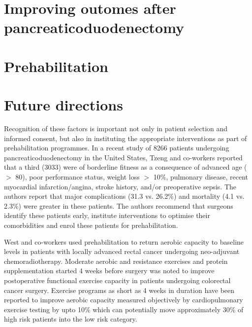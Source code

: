 

\section{Improving outomes after pancreaticoduodenectomy}


\section{Prehabilitation}


\section{Future directions}
Recognition of these factors is important not only in patient selection and informed consent, but also in instituting the appropriate interventions as part of prehabilitation programmes. 
In a recent study of 8266 patients undergoing pancreaticoduodenectomy in the United States, Tzeng and co-workers reported that a third (3033) were of borderline fitness as a consequence of advanced age ($>$ 80), poor performance status, weight loss $>$ 10\%, pulmonary disease, recent myocardial infarction/angina, stroke history, and/or preoperative sepsis. 
The authors report that major complications (31.3 vs. 26.2\%) and mortality (4.1 vs. 2.3\%) were greater in these patients.\parencite{tzeng_morbidity_2014} 
The authors recommend that surgeons identify these patients early, institute interventions to optimise their comorbidities and enrol these patients for prehabilitation. 

West and co-workers used prehabilitation to return aerobic capacity to baseline levels in patients with locally advanced rectal cancer undergoing neo-adjuvant chemoradiotherapy.\parencite{west_effect_2015} 
Moderate aerobic and resistance exercises and protein supplementation started 4 weeks before surgery was noted to improve postoperative functional exercise capacity in patients undergoing colorectal cancer surgery.\parencite{gillis_prehabilitation_2014}
Exercise programs as short as 4 weeks in duration have been reported to improve aerobic capacity measured objectively by cardiopulmonary exercise testing by upto 10\% which can potentially move approximately 30\% of high risk patients into the low risk category.\parencite{dunne_pmo-029_2012}

